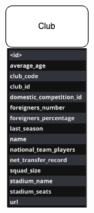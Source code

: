 \documentclass{Configuration_Files/PoliMi3i_thesis}
\begin{document}
\begin{figure}[htbp]
  \centering
  \begin{subfigure}[b]{0.2\linewidth}
    \includegraphics[width=\linewidth]{Project Template/Images/entities/club.drawio.png}

\end{subfigure}
\end{figure}
\end{document}
